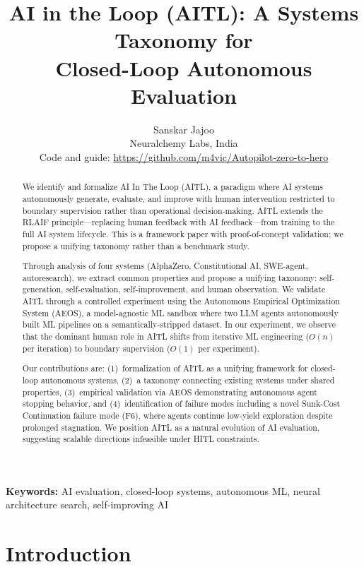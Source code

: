 \documentclass[11pt]{article}
\title{AI in the Loop (AITL): A Systems Taxonomy for\\Closed-Loop Autonomous Evaluation}
\author{
  Sanskar Jajoo\\
  Neuralchemy Labs, India\\
  Code and guide: \url{https://github.com/m4vic/Autopilot-zero-to-hero}
}
\date{}
\begin{document}
\maketitle

\begin{abstract}
We identify and formalize AI In The Loop (AITL), a paradigm where AI systems autonomously generate, evaluate, and improve with human intervention restricted to boundary supervision rather than operational decision-making. AITL extends the RLAIF principle---replacing human feedback with AI feedback---from training to the full AI system lifecycle. This is a framework paper with proof-of-concept validation; we propose a unifying taxonomy rather than a benchmark study.

Through analysis of four systems (AlphaZero, Constitutional AI, SWE-agent, autoresearch), we extract common properties and propose a unifying taxonomy: self-generation, self-evaluation, self-improvement, and human observation. We validate AITL through a controlled experiment using the Autonomous Empirical Optimization System (AEOS), a model-agnostic ML sandbox where two LLM agents autonomously built ML pipelines on a semantically-stripped dataset. In our experiment, we observe that the dominant human role in AITL shifts from iterative ML engineering ($O(n)$ per iteration) to boundary supervision ($O(1)$ per experiment).

Our contributions are: (1)~formalization of AITL as a unifying framework for closed-loop autonomous systems, (2)~a taxonomy connecting existing systems under shared properties, (3)~empirical validation via AEOS demonstrating autonomous agent stopping behavior, and (4)~identification of failure modes including a novel Sunk-Cost Continuation failure mode (F6), where agents continue low-yield exploration despite prolonged stagnation. We position AITL as a natural evolution of AI evaluation, suggesting scalable directions infeasible under HITL constraints.
\end{abstract}

\noindent\textbf{Keywords:} AI evaluation, closed-loop systems, autonomous ML, neural architecture search, self-improving AI

\section{Introduction}
\label{sec:intro}
\end{document}
